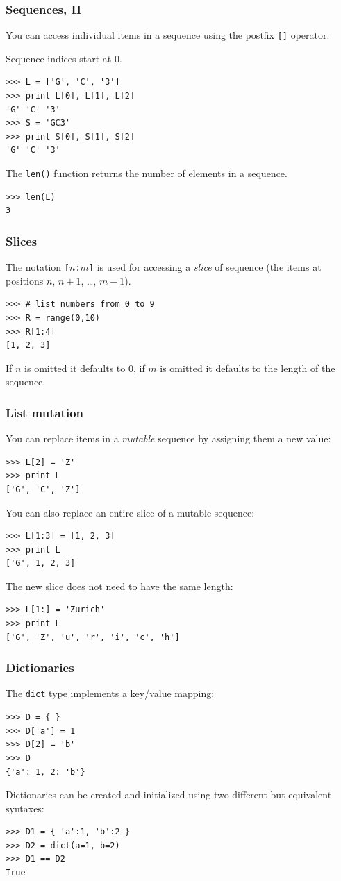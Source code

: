 \documentclass[english,serif,mathserif,xcolor=pdftex,dvipsnames,table]{beamer}
\begin{document}
\begin{frame}
  \frametitle{Sequences, II}
  You can access individual items in a sequence using the postfix
  \texttt{[]} operator.

  \+
  Sequence indices start at 0.
\begin{lstlisting}
>>> L = ['G', 'C', '3']
>>> print L[0], L[1], L[2]
'G' 'C' '3'
>>> S = 'GC3'
>>> print S[0], S[1], S[2]
'G' 'C' '3'
\end{lstlisting}

  \+
  The \texttt{len()} function returns the number of elements in a
  sequence.
\begin{lstlisting}
>>> len(L)
3
\end{lstlisting}
\end{frame}


\begin{frame}[fragile]
  \frametitle{Slices}
  The notation \texttt{[$n$:$m$]} is used for accessing a \emph{slice}
  of sequence (the items at positions $n$, $n+1$, \ldots, $m-1$).
\begin{lstlisting}
>>> # list numbers from 0 to 9
>>> R = range(0,10)
>>> R[1:4]
[1, 2, 3]
\end{lstlisting}

  \+
  If $n$ is omitted it defaults to 0, if $m$ is omitted it defaults to
  the length of the sequence.
\end{frame}


\begin{frame}[fragile]
  \frametitle{List mutation}
  You can replace items in a \emph{mutable} sequence by assigning them
  a new value:
\begin{lstlisting}
>>> L[2] = 'Z'
>>> print L
['G', 'C', 'Z']
\end{lstlisting}

  You can also replace an entire slice of a mutable sequence:
\begin{lstlisting}
>>> L[1:3] = [1, 2, 3]
>>> print L
['G', 1, 2, 3]
\end{lstlisting}
  The new slice does not need to have the same length:
\begin{lstlisting}
>>> L[1:] = 'Zurich'
>>> print L
['G', 'Z', 'u', 'r', 'i', 'c', 'h']
\end{lstlisting}
\end{frame}

\begin{frame}[fragile]
  \frametitle{Dictionaries}
  The \texttt{dict} type implements a key/value mapping:
\begin{lstlisting}
>>> D = { }
>>> D['a'] = 1
>>> D[2] = 'b'
>>> D
{'a': 1, 2: 'b'}
\end{lstlisting}

  \+
  Dictionaries can be created and initialized using two
  different but equivalent syntaxes:
\begin{lstlisting}
>>> D1 = { 'a':1, 'b':2 }
>>> D2 = dict(a=1, b=2)
>>> D1 == D2
True
\end{lstlisting}
\end{frame}
\end{document}
